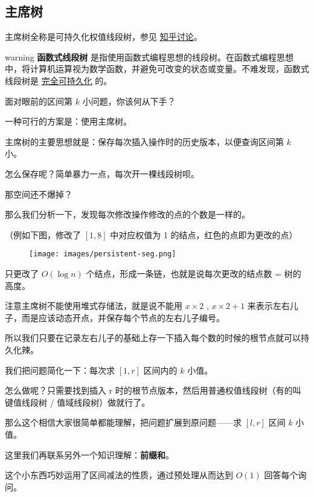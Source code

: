 
\subsection{主席树}

主席树全称是可持久化权值线段树，参见 \href{https://www.zhihu.com/question/59195374}{知乎讨论}。

\begin{NOTE}{warning}{}
\textbf{函数式线段树} 是指使用函数式编程思想的线段树。在函数式编程思想中，将计算机运算视为数学函数，并避免可改变的状态或变量。不难发现，函数式线段树是 \href{/ds/persistent/#_2}{完全可持久化} 的。
\end{NOTE}


面对眼前的区间第 $k$ 小问题，你该何从下手？

一种可行的方案是：使用主席树。  

主席树的主要思想就是：保存每次插入操作时的历史版本，以便查询区间第 $k$ 小。

怎么保存呢？简单暴力一点，每次开一棵线段树呗。  

那空间还不爆掉？

那么我们分析一下，发现每次修改操作修改的点的个数是一样的。  

（例如下图，修改了 $[1,8]$ 中对应权值为 1 的结点，红色的点即为更改的点）  

\begin{figure}[h]
\centering
\texttt{[image: images/persistent-seg.png]} 

\end{figure}

只更改了 $O(\log{n})$ 个结点，形成一条链，也就是说每次更改的结点数 = 树的高度。  

注意主席树不能使用堆式存储法，就是说不能用 $x\times 2$ , $x\times 2+1$ 来表示左右儿子，而是应该动态开点，并保存每个节点的左右儿子编号。  

所以我们只要在记录左右儿子的基础上存一下插入每个数的时候的根节点就可以持久化辣。

我们把问题简化一下：每次求 $[1,r]$ 区间内的 $k$ 小值。  

怎么做呢？只需要找到插入 r 时的根节点版本，然后用普通权值线段树（有的叫键值线段树 / 值域线段树）做就行了。

那么这个相信大家很简单都能理解，把问题扩展到原问题——求 $[l,r]$ 区间 $k$ 小值。  

这里我们再联系另外一个知识理解：\textbf{前缀和}。  

这个小东西巧妙运用了区间减法的性质，通过预处理从而达到 $O(1)$ 回答每个询问。

